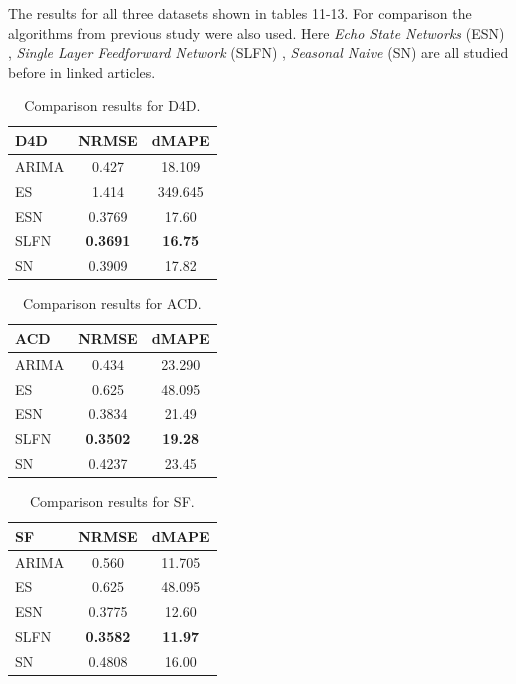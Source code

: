 \documentclass[12pt,a4paper]{article}
\theoremstyle{myplain}
\numberwithin{equation}{section}
\begin{document}
The results for all three datasets shown in tables 11-13. For comparison the algorithms from previous study were also used. Here \textit{Echo State Networks} (ESN) \cite{MainPaper}, \textit{Single Layer Feedforward Network} (SLFN) \cite{MainPaper}, \textit{Seasonal Naive} (SN) \cite{SidePaperSN} are all studied before in linked articles.

\begin{table}[h!]
\label{tab:table11}
\begin{center}
\begin{tabular}{l|cc}
D4D & NRMSE & dMAPE \\
\hline
ARIMA & 0.427 & 18.109 \\
ES & 1.414 & 349.645 \\
ESN & 0.3769 & 17.60 \\
SLFN & \textbf{0.3691} & \textbf{16.75} \\
SN & 0.3909 & 17.82 \\
\hline
\end{tabular}
\end{center}
\caption{Comparison results for D4D.}
\end{table}

\begin{table}[h!]
\label{tab:table12}
\begin{center}
\begin{tabular}{l|cc}
ACD & NRMSE & dMAPE \\
\hline
ARIMA & 0.434 & 23.290 \\
ES & 0.625 & 48.095 \\
ESN & 0.3834 & 21.49 \\
SLFN & \textbf{0.3502} & \textbf{19.28} \\
SN & 0.4237 & 23.45 \\
\hline
\end{tabular}
\end{center}
\caption{Comparison results for ACD.}
\end{table}

\begin{table}[h!]
\label{tab:table13}
\begin{center}
\begin{tabular}{l|cc}
SF & NRMSE & dMAPE \\
\hline
ARIMA & 0.560 & 11.705 \\
ES & 0.625 & 48.095 \\
ESN & 0.3775 & 12.60 \\
SLFN & \textbf{0.3582} & \textbf{11.97} \\
SN & 0.4808 & 16.00 \\
\hline
\end{tabular}
\end{center}
\caption{Comparison results for SF.}
\end{table}
\end{document}
